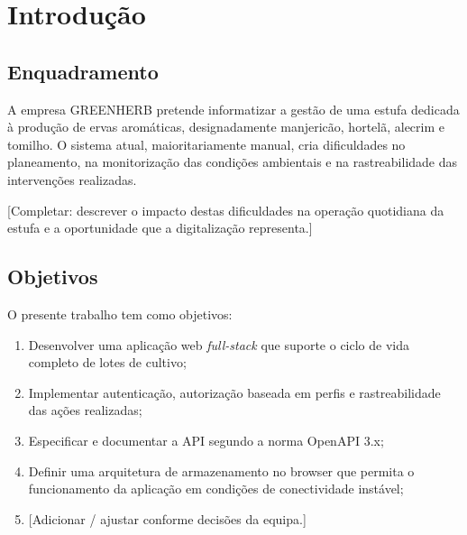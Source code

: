 
\chapter{Introdução}
\label{cap:introducao}


\section{Enquadramento}
\label{sec:enquadramento}


A empresa GREENHERB pretende informatizar a gestão de uma estufa
dedicada à produção de ervas aromáticas, designadamente
manjericão, hortelã, alecrim e tomilho. O sistema atual,
maioritariamente manual, cria dificuldades no planeamento, na
monitorização das condições ambientais e na rastreabilidade das
intervenções realizadas.

[Completar: descrever o impacto destas dificuldades na operação
quotidiana da estufa e a oportunidade que a digitalização representa.]


\section{Objetivos}
\label{sec:objetivos}


O presente trabalho tem como objetivos:

\begin{enumerate}
  \item Desenvolver uma aplicação web \emph{full-stack} que suporte o ciclo de vida completo de lotes de cultivo;
  \item Implementar autenticação, autorização baseada em perfis e rastreabilidade das ações realizadas;
  \item Especificar e documentar a API segundo a norma OpenAPI 3.x;
  \item Definir uma arquitetura de armazenamento no browser que permita o funcionamento da aplicação em condições de conectividade instável;
  \item {}[Adicionar / ajustar conforme decisões da equipa.]
\end{enumerate}



